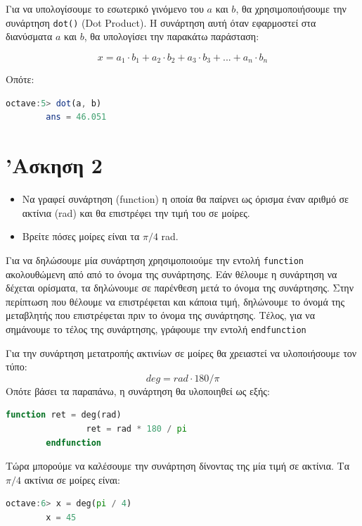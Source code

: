 \documentclass{article}
\begin{document}
Για να υπολογίσουμε το εσωτερικό γινόμενο του $a$ και $b$, θα χρησιμοποιήσουμε
την συνάρτηση \lstinline{dot()} (Dot Product). Η συνάρτηση αυτή όταν εφαρμοστεί
στα διανύσματα $a$ και $b$, θα υπολογίσει την παρακάτω παράσταση:

\[x = a_1 \cdot b_1 + a_2 \cdot b_2 + a_3 \cdot b_3 + ... + a_n \cdot b_n\]

Οπότε:

\begin{lstlisting}[language=octave]
        octave:5> dot(a, b)
        ans = 46.051
\end{lstlisting}

\section{'Ασκηση 2}

\begin{itemize}
        \item Να γραφεί συνάρτηση (function) η οποία θα παίρνει ως όρισμα
                έναν αριθμό σε ακτίνια (rad) και θα επιστρέφει την τιμή του
                σε μοίρες.
        \item Βρείτε πόσες μοίρες είναι τα $\pi/4$ rad.
\end{itemize}

Για να δηλώσουμε μία συνάρτηση χρησιμοποιούμε την εντολή \lstinline{function}
ακολουθώμενη από από το όνομα της συνάρτησης. Εάν θέλουμε η συνάρτηση να δέχεται
ορίσματα, τα δηλώνουμε σε παρένθεση μετά το όνομα της συνάρτησης. Στην περίπτωση
που θέλουμε να επιστρέφεται και κάποια τιμή, δηλώνουμε το όνομά της μεταβλητής
που επιστρέφεται πριν το όνομα της συνάρτησης. Τέλος, για να σημάνουμε το τέλος
της συνάρτησης, γράφουμε την εντολή \lstinline{endfunction}

Για την συνάρτηση μετατροπής ακτινίων σε μοίρες θα χρειαστεί να υλοποιήσουμε
τον τύπο:
\[deg = rad \cdot 180 / \pi\]
Οπότε βάσει τα παραπάνω, η συνάρτηση θα υλοποιηθεί ως εξής:

\begin{lstlisting}[language=octave]
        function ret = deg(rad)
                ret = rad * 180 / pi
        endfunction
\end{lstlisting}

Τώρα μπορούμε να καλέσουμε την συνάρτηση δίνοντας της μία τιμή σε ακτίνια.
Τα $\pi / 4$ ακτίνια σε μοίρες είναι:

\begin{lstlisting}[language=octave]
        octave:6> x = deg(pi / 4)
        x = 45
\end{lstlisting}
\end{document}
